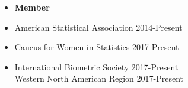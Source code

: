 \documentclass[11pt]{article}
\makeatletter
\newcommand\regsz{\@setfontsize\regsz{12pt}{6}}
\newcommand{\tab}{\hspace*{2em}}
\makeatother
\begin{document}
\begin{itemize}
	\item[] \textbf{Member} \vspace{-4mm}
	\item[] American Statistical Association \hfill 2014-Present \vspace{-4mm}
	\item[] Caucus for Women in Statistics \hfill 2017-Present \vspace{-4mm}
	\item[] International Biometric Society \hfill 2017-Present \vspace{-1mm}\\
	\tab Western North American Region \hfill 2017-Present  \vspace{-4mm}
\end{itemize}

%
\end{document}
